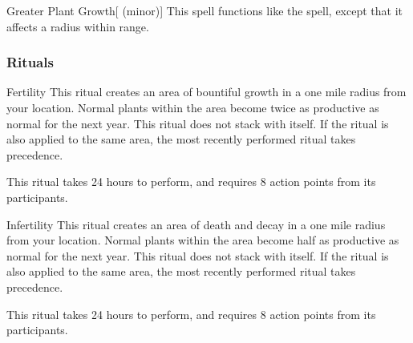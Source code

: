 \lowercase{\hypertarget{spell:Greater Plant Growth}{}}\label{spell:Greater Plant Growth}
\begin{freeability}[\nth{5}]{\hypertarget{spell:Greater Plant Growth}{Greater Plant Growth}}[ (minor)]
This spell functions like the  spell, except that it affects a \arealarge radius within \rnglong range.
\end{freeability}
\vspace{0.25em}



\subsubsection{Rituals}


\lowercase{\hypertarget{spell:Fertility}{}}\label{spell:Fertility}
\begin{freeability}[\nth{2}]{\hypertarget{spell:Fertility}{Fertility}}
This ritual creates an area of bountiful growth in a one mile radius  from your location.
Normal plants within the area become twice as productive as normal for the next year.
This ritual does not stack with itself.
If the  ritual is also applied to the same area, the most recently performed ritual takes precedence.

This ritual takes 24 hours to perform, and requires 8 action points from its participants.
\end{freeability}
\vspace{0.25em}



\lowercase{\hypertarget{spell:Infertility}{}}\label{spell:Infertility}
\begin{freeability}[\nth{2}]{\hypertarget{spell:Infertility}{Infertility}}
This ritual creates an area of death and decay in a one mile radius  from your location.
Normal plants within the area become half as productive as normal for the next year.
This ritual does not stack with itself.
If the  ritual is also applied to the same area, the most recently performed ritual takes precedence.

This ritual takes 24 hours to perform, and requires 8 action points from its participants.
\end{freeability}
\vspace{0.25em}



